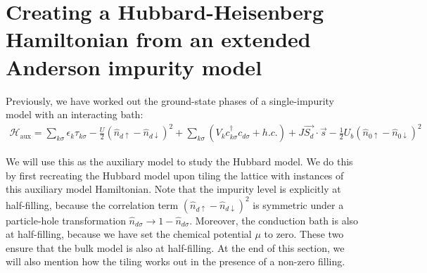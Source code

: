 \documentclass[prb]{revtex4-2}
\begin{document}
\section{Creating a Hubbard-Heisenberg Hamiltonian from an extended Anderson impurity model}

Previously, we have worked out the ground-state phases of a single-impurity model with an interacting bath:
\begin{equation}\begin{aligned}
	\label{siam_attr}
	\mathcal{H}_\text{aux} = \sum_{k\sigma}\epsilon_k \tau_{k\sigma} - \frac{U}{2}\left(\hat n_{d \uparrow} - \hat n_{d \downarrow} \right) ^2 + \sum_{k\sigma} \left(V_{k} c^\dagger_{k\sigma} c_{d\sigma} + h.c.\right) +J \vec{S_d}\cdot\vec{s} - \frac{1}{2}U_b\left(\hat n_{0 \uparrow} - \hat n_{0 \downarrow}\right)^2 
\end{aligned}\end{equation}
 
We will use this as the auxiliary model to study the Hubbard model. We do this by first recreating the Hubbard model upon tiling the lattice with instances of this auxiliary model Hamiltonian. Note that the impurity level is explicitly at half-filling, because the correlation term \(\left( \hat n_{d \uparrow} - \hat n_{d \downarrow} \right) ^2\) is symmetric under a particle-hole transformation \(\hat n_{d\sigma} \to 1 - \hat n_{d\sigma}\). Moreover, the conduction bath is also at half-filling, because we have set the chemical potential \(\mu\) to zero. These two ensure that the bulk model is also at half-filling. At the end of this section, we will also mention how the tiling works out in the presence of a non-zero filling.
\end{document}
